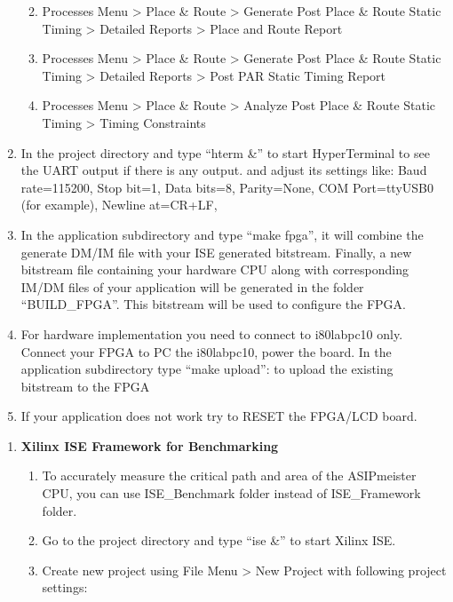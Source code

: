 \documentclass[
]{article}
\begin{document}
\begin{enumerate}
  \begin{enumerate}
  \def\labelenumii{\arabic{enumii}.}
  \item
    Processes Menu \textgreater{} Place \& Route \textgreater{} Generate
    Post Place \& Route Static Timing \textgreater{} Detailed Reports
    \textgreater{} Place and Route Report
  \item
    Processes Menu \textgreater{} Place \& Route \textgreater{} Generate
    Post Place \& Route Static Timing \textgreater{} Detailed Reports
    \textgreater{} Post PAR Static Timing Report
  \item
    Processes Menu \textgreater{} Place \& Route \textgreater{} Analyze
    Post Place \& Route Static Timing \textgreater{} Timing Constraints
  \end{enumerate}
\item
  In the project directory and type ``hterm \&'' to start HyperTerminal
  to see the UART output if there is any output. and adjust its settings
  like: Baud rate=115200, Stop bit=1, Data bits=8, Parity=None, COM
  Port=ttyUSB0 (for example), Newline at=CR+LF,
\item
  In the application subdirectory and type ``make fpga'', it will
  combine the generate DM/IM file with your ISE generated bitstream.
  Finally, a new bitstream file containing your hardware CPU along with
  corresponding IM/DM files of your application will be generated in the
  folder ``BUILD\_FPGA''. This bitstream will be used to configure the
  FPGA.
\item
  For hardware implementation you need to connect to i80labpc10 only.
  Connect your FPGA to PC the i80labpc10, power the board. In the
  application subdirectory type ``make upload'': to upload the existing
  bitstream to the FPGA
\item
  If your application does not work try to RESET the FPGA/LCD board.
\end{enumerate}

\begin{enumerate}
\def\labelenumi{\arabic{enumi}.}
\setcounter{enumi}{3}
\item
  \textbf{Xilinx ISE Framework for Benchmarking}

  \begin{enumerate}
  \def\labelenumii{\arabic{enumii}.}
  \item
    To accurately measure the critical path and area of the ASIPmeister
    CPU, you can use ISE\_Benchmark folder instead of ISE\_Framework
    folder.
  \item
    Go to the project directory and type ``ise \&'' to start Xilinx ISE.
  \item
    Create new project using File Menu \textgreater{} New Project with
    following project settings:
  \end{enumerate}
\end{enumerate}
\end{document}
